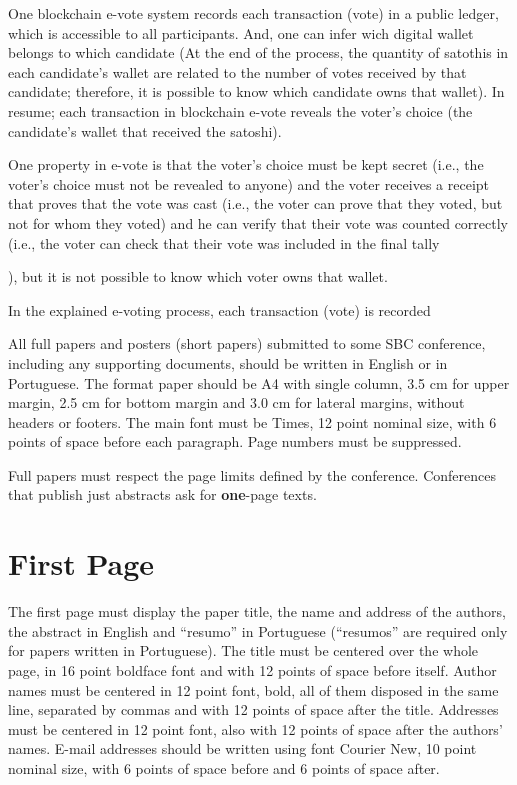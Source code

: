 \documentclass[12pt]{article}
\begin{document}
One blockchain e-vote system records each transaction (vote) in a public ledger, 
which is accessible to all participants. And, one can infer wich digital wallet belongs 
to which candidate (At the end of the process, the quantity of satothis in each candidate's wallet 
are related to the number of votes received by that candidate; therefore, it is possible to know which 
candidate owns that wallet). In resume; each transaction in blockchain e-vote reveals
the voter's choice (the candidate's wallet that received the satoshi). 

One property in e-vote is that the voter's choice must be kept secret (i.e., the voter's choice must not be revealed 
to anyone) and the voter receives a receipt that proves that the vote was cast 
(i.e., the voter can prove that they voted, but not for whom they voted) and he can verify that their vote was 
counted correctly (i.e., the voter can check that their vote was included in the final tally






), but it is not possible to know which voter owns that wallet.








In the explained e-voting process, each transaction (vote) is recorded 

All full papers and posters (short papers) submitted to some SBC conference,
including any supporting documents, should be written in English or in
Portuguese. The format paper should be A4 with single column, 3.5 cm for upper
margin, 2.5 cm for bottom margin and 3.0 cm for lateral margins, without
headers or footers. The main font must be Times, 12 point nominal size, with 6
points of space before each paragraph. Page numbers must be suppressed.

Full papers must respect the page limits defined by the conference.
Conferences that publish just abstracts ask for \textbf{one}-page texts.

\section{First Page} \label{sec:firstpage}

The first page must display the paper title, the name and address of the
authors, the abstract in English and ``resumo'' in Portuguese (``resumos'' are
required only for papers written in Portuguese). The title must be centered
over the whole page, in 16 point boldface font and with 12 points of space
before itself. Author names must be centered in 12 point font, bold, all of
them disposed in the same line, separated by commas and with 12 points of
space after the title. Addresses must be centered in 12 point font, also with
12 points of space after the authors' names. E-mail addresses should be
written using font Courier New, 10 point nominal size, with 6 points of space
before and 6 points of space after.
\end{document}
